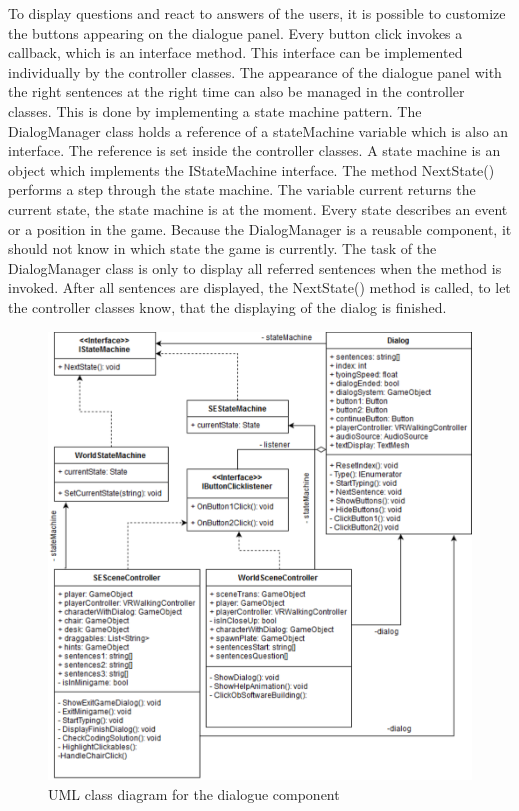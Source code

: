 To display questions and react to answers of the users, it is possible to customize the buttons appearing on the dialogue panel. Every button click invokes a callback, which is an interface method. This interface can be implemented individually by the controller classes. The appearance of the dialogue panel with the right sentences at the right time can also be managed in the controller classes. This is done by implementing a state machine pattern. The DialogManager class holds a reference of a stateMachine variable which is also an interface. The reference is set inside the controller classes. A state machine is an object which implements the IStateMachine interface. The method NextState() performs a step through the state machine. The variable current returns the current state, the state machine is at the moment. Every state describes an event or a position in the game. Because the DialogManager is a reusable component, it should not know in which state the game is currently. The task of the DialogManager class is only to display all referred sentences when the method is invoked. After all sentences are displayed, the NextState() method is called, to let the controller classes know, that the displaying of the dialog is finished. 
\begin{figure}[h!]
  \includegraphics[width=13cm]{kapitel/eps/uml-dialog.pdf}
  \centering
  \caption{UML class diagram for the dialogue component}
  \label{fig:uml-universalinput}
\end{figure}

